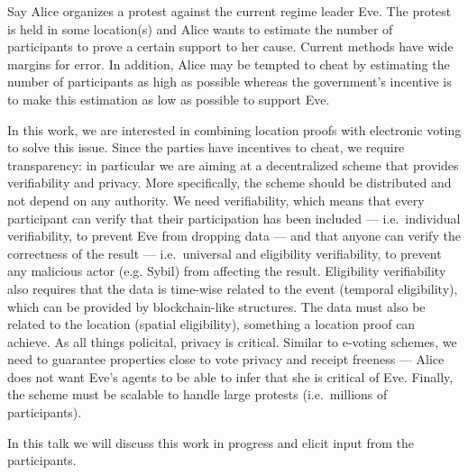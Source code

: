 Say Alice organizes a protest against the current regime leader Eve.
The protest is held in some location(s) and Alice wants to estimate the number 
of participants to prove a certain support to her cause.
Current methods have wide margins for error.
In addition, Alice may be tempted to cheat by estimating the number of 
participants as high as possible whereas the government's incentive is to make 
this estimation as low as possible to support Eve.
                                                                                  
In this work, we are interested in combining location proofs with electronic 
voting to solve this issue.
Since the parties have incentives to cheat, we require transparency: in 
particular we are aiming at a decentralized scheme that provides verifiability 
and privacy.
More specifically, the scheme should be distributed and not depend on any 
authority.
We need verifiability, which means that every participant can verify that their 
participation has been included --- i.e.\ individual verifiability, to prevent 
Eve from dropping data --- and that anyone can verify the correctness of the 
result --- i.e.\ universal and eligibility verifiability, to prevent any 
malicious actor (e.g. Sybil) from affecting the result.
Eligibility verifiability also requires that the data is time-wise related to 
the event (temporal eligibility), which can be provided by blockchain-like 
structures.
The data must also be related to the location (spatial eligibility), something 
a location proof can achieve.
As all things policital, privacy is critical.
Similar to e-voting schemes, we need to guarantee properties close to vote 
privacy and receipt freeness --- Alice does not want Eve's agents to be able to 
infer that she is critical of Eve.
Finally, the scheme must be scalable to handle large protests (i.e.\ millions 
of participants).

In this talk we will discuss this work in progress and elicit input from the
participants.

